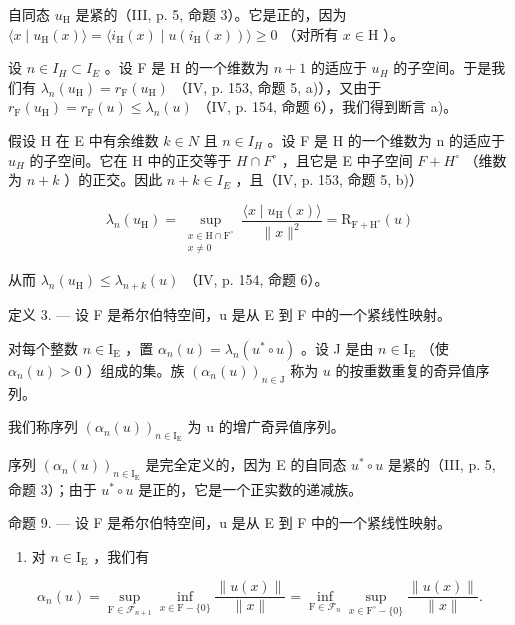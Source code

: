 自同态 \(u_{\mathrm{H}}\) 是紧的（III, p. 5, 命题 3）。它是正的，因为 \(\langle x \mid u_{\mathrm{H}}(x) \rangle = \langle i_{\mathrm{H}}(x) \mid u(i_{\mathrm{H}}(x)) \rangle \geqslant 0\) （对所有 \(x \in \mathrm{H}\) ）。

设 \(n \in I_{H} \subset I_{E}\) 。设 F 是 H 的一个维数为 \(n + 1\) 的适应于 \(u_{H}\) 的子空间。于是我们有 \(\lambda_{n}(u_{\mathrm{H}}) = r_{\mathrm{F}}(u_{\mathrm{H}})\) （IV, p. 153, 命题 5, a)），又由于 \(r_{\mathrm{F}}(u_{\mathrm{H}}) = r_{\mathrm{F}}(u) \leqslant \lambda_{n}(u)\) （IV, p. 154, 命题 6），我们得到断言 a)。

假设 H 在 E 中有余维数 \(k \in N\) 且 \(n \in I_{H}\) 。设 F 是 H 的一个维数为 n 的适应于 \(u_{H}\) 的子空间。它在 H 中的正交等于 \(H \cap F^{\circ}\) ，且它是 E 中子空间 \(F + H^{\circ}\) （维数为 \(n + k\) ）的正交。因此 \(n + k \in I_{E}\) ，且（IV, p. 153, 命题 5, b)）

\[
\lambda_{n}(u_{\mathrm{H}}) = \sup_{\substack{x\in \mathrm{H}\cap \mathrm{F}^{\circ}\\ x\neq 0}}\frac{\langle x\mid u_{\mathrm{H}}(x)\rangle}{\|x\|^{2}} = \mathrm{R}_{\mathrm{F} + \mathrm{H}^{\circ}}(u)
\]

从而 \(\lambda_{n}(u_{\mathrm{H}})\leqslant \lambda_{n + k}(u)\) （IV, p. 154, 命题 6）。

定义 3. --- 设 F 是希尔伯特空间，u 是从 E 到 F 中的一个紧线性映射。

对每个整数 \(n \in \mathrm{I}_{\mathrm{E}}\) ，置 \(\alpha_{n}(u) = \lambda_{n}(u^{*} \circ u)\) 。设 J 是由 \(n \in \mathrm{I}_{\mathrm{E}}\) （使 \(\alpha_{n}(u) > 0\) ）组成的集。族 \((\alpha_{n}(u))_{n \in \mathrm{J}}\) 称为 \(u\) 的按重数重复的奇异值序列。

我们称序列 \((\alpha_{n}(u))_{n\in\mathrm{I}_{\mathrm{E}}}\) 为 u 的增广奇异值序列。

序列 \((\alpha_{n}(u))_{n\in\mathrm{I}_{\mathrm{E}}}\) 是完全定义的，因为 E 的自同态 \(u^{*}\circ u\) 是紧的（III, p. 5, 命题 3）；由于 \(u^{*}\circ u\) 是正的，它是一个正实数的递减族。

命题 9. --- 设 F 是希尔伯特空间，u 是从 E 到 F 中的一个紧线性映射。

\begin{enumerate}
\def\labelenumi{\alph{enumi})}
\tightlist
\item
  对 \(n \in \mathrm{I}_{\mathrm{E}}\) ，我们有
\end{enumerate}

\[
\alpha_ {n} (u) = \sup _ {\mathrm{F} \in \mathscr {F} _ {n + 1}} \inf _ {x \in \mathrm{F} - \{0 \}} \frac {\| u (x) \|}{\| x \|} = \inf _ {\mathrm{F} \in \mathscr {F} _ {n}} \sup _ {x \in \mathrm{F} ^ {\circ} - \{0 \}} \frac {\| u (x) \|}{\| x \|}.
\]


